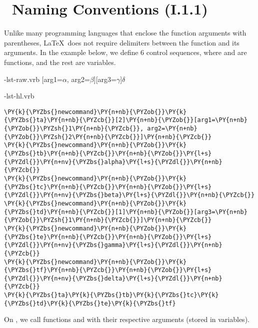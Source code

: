 \documentclass{ltugboat}
\begin{document}
\section{\liii\ Naming Conventions (I.1.1)}
Unlike many programming languages that enclose the function arguments with parentheses, \LaTeX\ does not require delimiters between the function and its arguments. 
In the example below, we define 6 control sequences, where  and  are functions, and the rest are variables.
\def\CurrentEnvName{latexsample*}
\begin{filecontents}{\jobname-lst-raw.vrb}
\newcommand{\ta}[2]{[arg1={#1}, arg2={#2}]}
\newcommand{\tb}{$\alpha$}
\newcommand{\tc}{$\beta$}
\newcommand{\td}[1]{[arg3={#1}]}
\newcommand{\te}{$\gamma$}
\newcommand{\tf}{$\delta$}
\ta\tb\tc\td\te\tf
\end{filecontents}
\begin{filecontents}{\jobname-lst-hl.vrb}
\begin{Verbatim}[commandchars=\\\{\}]
\PY{k}{\PYZbs{}newcommand}\PY{n+nb}{\PYZob{}}\PY{k}{\PYZbs{}ta}\PY{n+nb}{\PYZcb{}}[2]\PY{n+nb}{\PYZob{}}[arg1=\PY{n+nb}{\PYZob{}}\PYZsh{}1\PY{n+nb}{\PYZcb{}}, arg2=\PY{n+nb}{\PYZob{}}\PYZsh{}2\PY{n+nb}{\PYZcb{}}]\PY{n+nb}{\PYZcb{}}
\PY{k}{\PYZbs{}newcommand}\PY{n+nb}{\PYZob{}}\PY{k}{\PYZbs{}tb}\PY{n+nb}{\PYZcb{}}\PY{n+nb}{\PYZob{}}\PY{l+s}{\PYZdl{}}\PY{n+nv}{\PYZbs{}alpha}\PY{l+s}{\PYZdl{}}\PY{n+nb}{\PYZcb{}}
\PY{k}{\PYZbs{}newcommand}\PY{n+nb}{\PYZob{}}\PY{k}{\PYZbs{}tc}\PY{n+nb}{\PYZcb{}}\PY{n+nb}{\PYZob{}}\PY{l+s}{\PYZdl{}}\PY{n+nv}{\PYZbs{}beta}\PY{l+s}{\PYZdl{}}\PY{n+nb}{\PYZcb{}}
\PY{k}{\PYZbs{}newcommand}\PY{n+nb}{\PYZob{}}\PY{k}{\PYZbs{}td}\PY{n+nb}{\PYZcb{}}[1]\PY{n+nb}{\PYZob{}}[arg3=\PY{n+nb}{\PYZob{}}\PYZsh{}1\PY{n+nb}{\PYZcb{}}]\PY{n+nb}{\PYZcb{}}
\PY{k}{\PYZbs{}newcommand}\PY{n+nb}{\PYZob{}}\PY{k}{\PYZbs{}te}\PY{n+nb}{\PYZcb{}}\PY{n+nb}{\PYZob{}}\PY{l+s}{\PYZdl{}}\PY{n+nv}{\PYZbs{}gamma}\PY{l+s}{\PYZdl{}}\PY{n+nb}{\PYZcb{}}
\PY{k}{\PYZbs{}newcommand}\PY{n+nb}{\PYZob{}}\PY{k}{\PYZbs{}tf}\PY{n+nb}{\PYZcb{}}\PY{n+nb}{\PYZob{}}\PY{l+s}{\PYZdl{}}\PY{n+nv}{\PYZbs{}delta}\PY{l+s}{\PYZdl{}}\PY{n+nb}{\PYZcb{}}
\PY{k}{\PYZbs{}ta}\PY{k}{\PYZbs{}tb}\PY{k}{\PYZbs{}tc}\PY{k}{\PYZbs{}td}\PY{k}{\PYZbs{}te}\PY{k}{\PYZbs{}tf}
\end{Verbatim}
\end{filecontents}
\noindent On , we call functions  and  with their respective arguments (stored in variables). 
\end{document}
